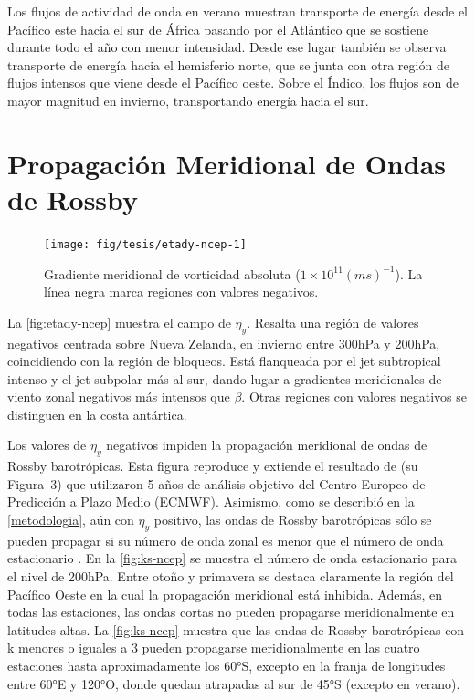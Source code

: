 \documentclass[spanish,a4paper,12pt,oneside]{book}
\begin{document}
Los flujos de actividad de onda en verano muestran transporte de energía
desde el Pacífico este hacia el sur de África pasando por el Atlántico
que se sostiene durante todo el año con menor intensidad. Desde ese
lugar también se observa transporte de energía hacia el hemisferio
norte, que se junta con otra región de flujos intensos que viene desde
el Pacífico oeste. Sobre el Índico, los flujos son de mayor magnitud en
invierno, transportando energía hacia el sur.

\section{Propagación Meridional de Ondas de
Rossby}\label{propagacion-meridional-de-ondas-de-rossby}

\begin{landscape}\begin{figure}

{\centering \texttt{[image: fig/tesis/etady-ncep-1]} 

}

\caption{Gradiente meridional de vorticidad absoluta ($1\times10^{11}(ms)^{-1}$). La línea negra marca regiones con valores negativos.}\label{fig:etady-ncep}
\end{figure}
\end{landscape}

La \autoref{fig:etady-ncep} muestra el campo de \(\eta_y\). Resalta una
región de valores negativos centrada sobre Nueva Zelanda, en invierno
entre 300hPa y 200hPa, coincidiendo con la región de bloqueos. Está
flanqueada por el jet subtropical intenso y el jet subpolar más al sur,
dando lugar a gradientes meridionales de viento zonal negativos más
intensos que \(\beta\). Otras regiones con valores negativos se
distinguen en la costa antártica.

Los valores de \(\eta_{y}\) negativos impiden la propagación meridional
de ondas de Rossby barotrópicas. Esta figura reproduce y extiende el
resultado de \citet{Berbery1992} (su Figura~3) que utilizaron 5 años de
análisis objetivo del Centro Europeo de Predicción a Plazo Medio
(ECMWF). Asimismo, como se describió en la \autoref{metodologia}, aún
con \(\eta_{y}\) positivo, las ondas de Rossby barotrópicas sólo se
pueden propagar si su número de onda zonal es menor que el número de
onda estacionario \citep{James}. En la \autoref{fig:ks-ncep} se muestra
el número de onda estacionario para el nivel de 200hPa. Entre otoño y
primavera se destaca claramente la región del Pacífico Oeste en la cual
la propagación meridional está inhibida. Además, en todas las
estaciones, las ondas cortas no pueden propagarse meridionalmente en
latitudes altas. La \autoref{fig:ks-ncep} muestra que las ondas de
Rossby barotrópicas con k menores o iguales a 3 pueden propagarse
meridionalmente en las cuatro estaciones hasta aproximadamente los 60°S,
excepto en la franja de longitudes entre 60°E y 120°O, donde quedan
atrapadas al sur de 45°S (excepto en verano).
\end{document}
